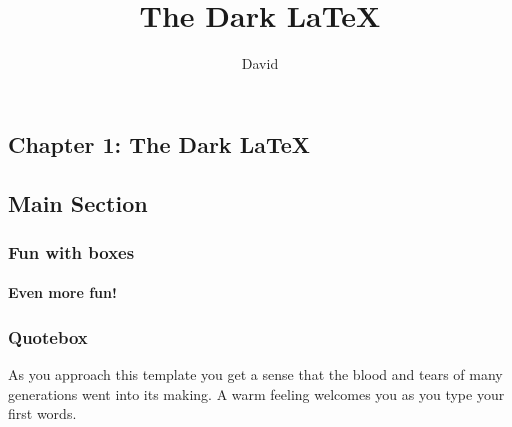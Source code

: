 \documentclass[10pt,%
  a4paper,%
  twoside,%
  openany%
  ]{book}
\title{The Dark \LaTeX}
\author{David}
\date{\thedate}
\begin{document}
\makeatletter


\selectfont


\frontmatter

\titlebackgroundimg
\lipsum[1] %
\clearpage

\begingroup
\let\clearpage\relax
\tocbackgroundimg

\tableofcontents
\endgroup
\clearpage

\mainmatter

\begin{multicols}{2}


\chapter{Chapter 1: The Dark \LaTeX}

\lipsum[1]

\section{Main Section}
\lipsum[1] %

\subsection{Fun with boxes}
\subsubsection{Even more fun!}

\begin{commentbox}{\commentquad}
  \lipsum[1]
\end{commentbox}

\subsection{Quotebox}

\begin{quotebox}
  As you approach this template you get a sense that the blood and tears of many generations went into its making. A warm feeling welcomes you as you type your first words.
\end{quotebox}

\newpage %


\end{multicols}
\end{document}
